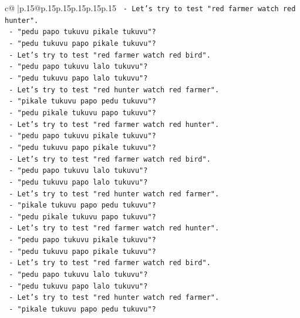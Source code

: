 \documentclass{article}
\begin{document}
{\begin{supertabular}{c@{$\;$}|p{.15\linewidth}@{}p{.15\linewidth}p{.15\linewidth}p{.15\linewidth}p{.15\linewidth}p{.15\linewidth}}
{{{\texttt{       {-} Let's try to test "red farmer watch red hunter".} \\
\texttt{         {-} "pedu papo tukuvu pikale tukuvu"?} \\
\texttt{         {-} "pedu tukuvu papo pikale tukuvu"?} \\
\texttt{       {-} Let's try to test "red farmer watch red bird".} \\
\texttt{         {-} "pedu papo tukuvu lalo tukuvu"?} \\
\texttt{         {-} "pedu tukuvu papo lalo tukuvu"?} \\
\texttt{       {-} Let's try to test "red hunter watch red farmer".} \\
\texttt{         {-} "pikale tukuvu papo pedu tukuvu"?} \\
\texttt{         {-} "pedu pikale tukuvu papo tukuvu"?} \\
\texttt{       {-} Let's try to test "red farmer watch red hunter".} \\
\texttt{         {-} "pedu papo tukuvu pikale tukuvu"?} \\
\texttt{         {-} "pedu tukuvu papo pikale tukuvu"?} \\
\texttt{       {-} Let's try to test "red farmer watch red bird".} \\
\texttt{         {-} "pedu papo tukuvu lalo tukuvu"?} \\
\texttt{         {-} "pedu tukuvu papo lalo tukuvu"?} \\
\texttt{       {-} Let's try to test "red hunter watch red farmer".} \\
\texttt{         {-} "pikale tukuvu papo pedu tukuvu"?} \\
\texttt{         {-} "pedu pikale tukuvu papo tukuvu"?} \\
\texttt{       {-} Let's try to test "red farmer watch red hunter".} \\
\texttt{         {-} "pedu papo tukuvu pikale tukuvu"?} \\
\texttt{         {-} "pedu tukuvu papo pikale tukuvu"?} \\
\texttt{       {-} Let's try to test "red farmer watch red bird".} \\
\texttt{         {-} "pedu papo tukuvu lalo tukuvu"?} \\
\texttt{         {-} "pedu tukuvu papo lalo tukuvu"?} \\
\texttt{       {-} Let's try to test "red hunter watch red farmer".} \\
\texttt{         {-} "pikale tukuvu papo pedu tukuvu"?} \\
}}}
\end{supertabular}}
\end{document}
